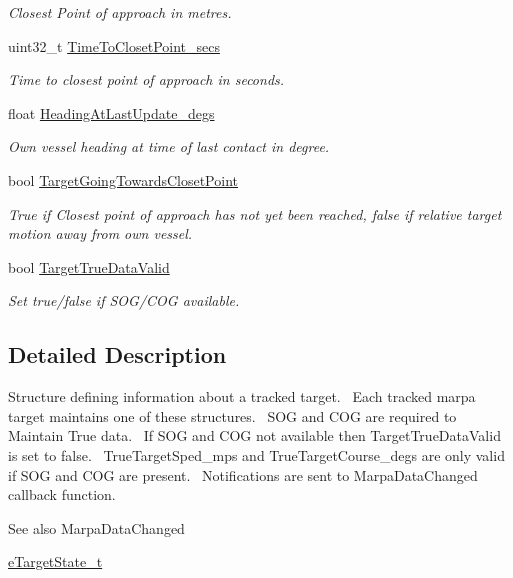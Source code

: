 \begin{DoxyCompactItemize}
\begin{DoxyCompactList}\small\item\em Closest Point of approach in metres. \end{DoxyCompactList}\item 
uint32\+\_\+t \mbox{\hyperlink{struct_quantum_lib_1_1_marpa_data__t_a3a54e31b40d50407ce52ef42d464c4cf}{Time\+To\+Closet\+Point\+\_\+secs}}
\begin{DoxyCompactList}\small\item\em Time to closest point of approach in seconds. \end{DoxyCompactList}\item 
float \mbox{\hyperlink{struct_quantum_lib_1_1_marpa_data__t_a2819a023db3040c1b026f14fddae91c8}{Heading\+At\+Last\+Update\+\_\+degs}}
\begin{DoxyCompactList}\small\item\em Own vessel heading at time of last contact in degree. \end{DoxyCompactList}\item 
bool \mbox{\hyperlink{struct_quantum_lib_1_1_marpa_data__t_a3bc2c4ec0f98759e04d5561e61857637}{Target\+Going\+Towards\+Closet\+Point}}
\begin{DoxyCompactList}\small\item\em True if Closest point of approach has not yet been reached, false if relative target motion away from own vessel. \end{DoxyCompactList}\item 
bool \mbox{\hyperlink{struct_quantum_lib_1_1_marpa_data__t_a9f2d5b26e2eee4e6062655ac0f75b81d}{Target\+True\+Data\+Valid}}
\begin{DoxyCompactList}\small\item\em Set true/false if S\+O\+G/\+C\+OG available. \end{DoxyCompactList}\end{DoxyCompactItemize}


\subsection{Detailed Description}
Structure defining information about a tracked target.~\newline
Each tracked marpa target maintains one of these structures.~\newline
S\+OG and C\+OG are required to Maintain True data.~\newline
If S\+OG and C\+OG not available then Target\+True\+Data\+Valid is set to false.~\newline
True\+Target\+Sped\+\_\+mps and True\+Target\+Course\+\_\+degs are only valid if S\+OG and C\+OG are present.~\newline
Notifications are sent to Marpa\+Data\+Changed callback function. \begin{DoxySeeAlso}{See also}
Marpa\+Data\+Changed 

\mbox{\hyperlink{namespace_quantum_lib_ab53e7395955c4dfb725e2ff41809ca9e}{e\+Target\+State\+\_\+t}} 
\end{DoxySeeAlso}


